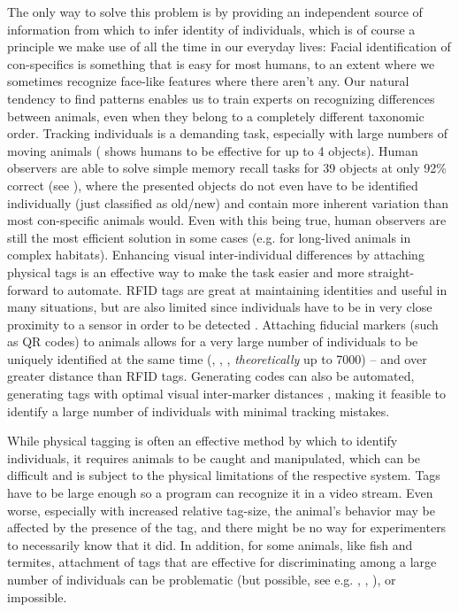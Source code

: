 \documentclass[9pt,lineno]{elife}
\begin{document}
The only way to solve this problem is by providing an independent source of information from which to infer identity of individuals, which is of course a principle we make use of all the time in our everyday lives: Facial identification of con-specifics is something that {\color{blue}is easy for most humans}, to an extent where we sometimes recognize face-like features where there aren't any. Our natural tendency to find patterns enables us to train experts on recognizing differences between animals, even when they belong to a completely different taxonomic order. Tracking individuals is a demanding task, especially with large numbers of moving animals (\citealt{liu2009effect} shows humans to be effective for up to 4 objects). Human observers are able to solve simple memory recall tasks for 39 objects at only 92\% correct (see \citealt{humphrey1992recognizing}), where the presented objects do not even have to be identified individually (just classified as old/new) and contain more inherent variation than most con-specific animals would. Even with this being true, human observers are still the most efficient solution in some cases (e.g. for long-lived animals in complex habitats). Enhancing visual inter-individual differences by attaching physical tags is an effective way to make the task easier and more straight-forward to automate. RFID tags are great at maintaining identities and useful in many situations, but are also limited since individuals have to be in very close proximity to a sensor in order to be detected \citep{bonter2011applications}. Attaching {\color{blue} fiducial markers (such as QR codes)} to animals allows for a very large number of individuals to be uniquely identified at the same time {\color{blue} (\citealt{Gernat1433}, \citealt{Wild2020.05.06.076943},} \citealt{mersch2013tracking}, \citealt{crall2015beetag} \textit{theoretically} up to 7000) -- and over greater distance than RFID tags. Generating codes can also be automated, generating tags with optimal visual inter-marker distances \citep{garrido2016generation}, making it feasible to identify a large number of individuals with minimal tracking mistakes.

While physical tagging is often an effective method by which to identify individuals, it requires animals to be caught and manipulated, which can be difficult \citep{mersch2013tracking} and is subject to the physical limitations of the respective system. Tags have to be large enough so a program can recognize it in a video stream. Even worse, especially with increased relative tag-size, the animal's behavior may be affected by the presence of the tag, and there might be no way for experimenters to necessarily know that it did. In addition, for some animals, like fish and termites, attachment of tags that are effective for discriminating among a large number of individuals can be problematic {\color{blue} (but possible, see e.g. \citealt{crall2015beetag}, \citealt{Gernat1433}, \citealt{Wild2020.05.06.076943}),} or impossible.
\end{document}
